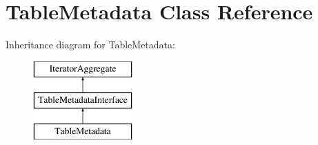 \hypertarget{class_pes_1_1_database_1_1_metadata_1_1_table_metadata}{}\section{Table\+Metadata Class Reference}
\label{class_pes_1_1_database_1_1_metadata_1_1_table_metadata}
Inheritance diagram for Table\+Metadata\+:\begin{figure}[H]
\begin{center}
\leavevmode
\includegraphics[height=3.000000cm]{class_pes_1_1_database_1_1_metadata_1_1_table_metadata}
\end{center}
\end{figure}
